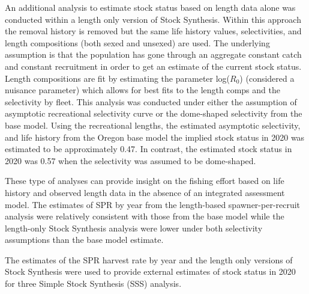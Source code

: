 \documentclass[11pt,
  english,
  a4paper,
]{article}
\begin{document}
\leavevmode\tagmcend\tagstructend\par


An additional analysis to estimate stock status based on length data alone was conducted within a length only version of Stock Synthesis. Within this approach the removal history is removed but the same life history values, selectivities, and length compositions (both sexed and unsexed) are used. The underlying assumption is that the population has gone through an aggregate constant catch and constant recruitment in order to get an estimate of the current stock status. Length compositions are fit by estimating the parameter log({\(R_0\)\leavevmode\tagmcend\tagstructend}) (considered a nuisance parameter) which allows for best fits to the length comps and the selectivity by fleet. This analysis was conducted under either the assumption of asymptotic recreational selectivity curve or the dome-shaped selectivity from the base model. Using the recreational lengths, the estimated asymptotic selectivity, and life history from the Oregon base model the implied stock status in 2020 was estimated to be approximately 0.47. In contrast, the estimated stock status in 2020 was 0.57 when the selectivity was assumed to be dome-shaped.

\leavevmode\tagmcend\tagstructend\par


These type of analyses can provide insight on the fishing effort based on life history and observed length data in the absence of an integrated assessment model. The estimates of SPR by year from the length-based spawner-per-recruit analysis were relatively consistent with those from the base model while the length-only Stock Synthesis analysis were lower under both selectivity assumptions than the base model estimate.

\leavevmode\tagmcend\tagstructend\par


The estimates of the SPR harvest rate by year and the length only versions of Stock Synthesis were used to provide external estimates of stock status in 2020 for three Simple Stock Synthesis (SSS) analysis.

\leavevmode\tagmcend\tagstructend\par
\end{document}
